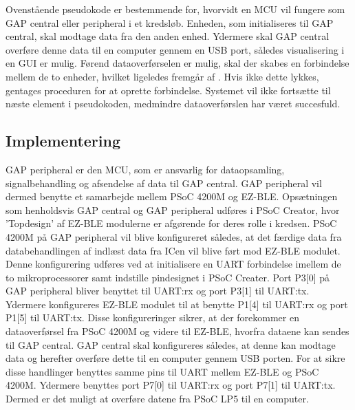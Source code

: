 Ovenstående pseudokode er bestemmende for, hvorvidt en MCU vil fungere som GAP central eller peripheral i et kredsløb. Enheden, som initialiseres til GAP central, skal modtage data fra den anden enhed. Ydermere skal GAP central overføre denne data til en computer gennem en USB port, således visualisering i en GUI er mulig. \newline
Førend dataoverførselen er mulig, skal der skabes en forbindelse mellem de to enheder, hvilket ligeledes fremgår af . Hvis ikke dette lykkes, gentages proceduren for at oprette forbindelse. %
Systemet vil ikke fortsætte til næste element i pseudokoden, medmindre dataoverførslen har været succesfuld.  

\subsection{Implementering}
GAP peripheral er den MCU, som er ansvarlig for dataopsamling, signalbehandling og afsendelse af data til GAP central. GAP peripheral vil dermed benytte et samarbejde mellem PSoC 4200M og EZ-BLE. Opsætningen som henholdsvis GAP central og GAP peripheral udføres i PSoC Creator, hvor ’Topdesign’ af EZ-BLE modulerne er afgørende for deres rolle i kredsen. \newline
PSoC 4200M på GAP peripheral vil blive konfigureret således, at det færdige data fra databehandlingen af indlæst data fra ICen vil blive ført mod EZ-BLE modulet. Denne konfigurering udføres ved at initialisere en UART forbindelse imellem de to mikroprocessorer samt indstille pindesignet i PSoC Creater. %
Port P3[0] på GAP peripheral bliver benyttet til UART:rx og port P3[1] til UART:tx. Ydermere konfigureres EZ-BLE modulet til at benytte P1[4] til UART:rx og port P1[5] til UART:tx. Disse konfigureringer sikrer, at der forekommer en dataoverførsel fra PSoC 4200M og videre til EZ-BLE, hvorfra dataene kan sendes til GAP central. \citep{Semiconductor20164200M} \newline
GAP central skal konfigureres således, at denne kan modtage data og herefter overføre dette til en computer gennem USB porten. For at sikre disse handlinger benyttes samme pins til UART mellem EZ-BLE og PSoC 4200M. Ydermere benyttes port P7[0] til UART:rx og port P7[1] til UART:tx. Dermed er det muligt at overføre datene fra PSoC LP5 til en computer. 


